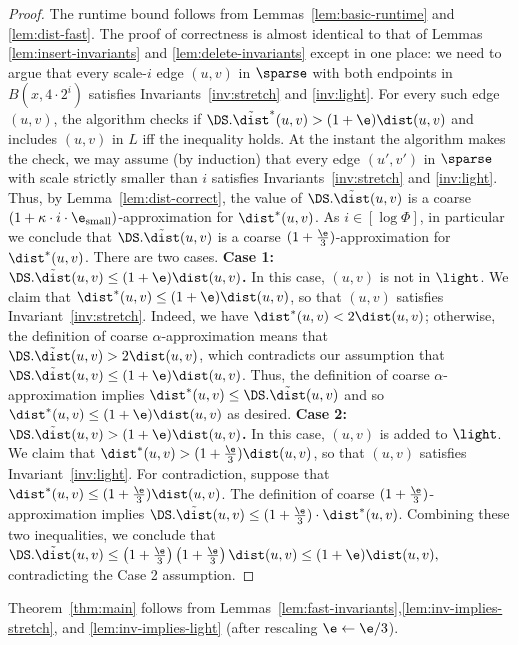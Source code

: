 \begin{proof}
    The runtime bound follows from Lemmas~\ref{lem:basic-runtime} and \ref{lem:dist-fast}. The proof of correctness is almost identical to that of Lemmas \ref{lem:insert-invariants} and \ref{lem:delete-invariants}
    except in one place: we need to argue that every scale-$i$ edge $(u,v)$ in $\sparse$ with both endpoints in $B(x, 4 \cdot 2^i)$ satisfies Invariants~\ref{inv:stretch} and \ref{inv:light}. 
%
    For every such edge $(u,v)$, the algorithm checks if $\DS.\tilde \dist^*(u,v) > (1+\e) \dist(u,v)$ and includes $(u,v)$ in $L$ iff the inequality holds. At the instant the algorithm makes the check, we may assume (by induction) that every edge $(u',v')$ in $\sparse$ with scale strictly smaller than $i$ satisfies Invariants~\ref{inv:stretch} and \ref{inv:light}. Thus, by Lemma~\ref{lem:dist-correct}, the value of $\DS.\tilde \dist(u,v)$ is a coarse $(1 + \kappa \cdot i \cdot \e_{\rm small})$-approximation for $\dist^*(u,v)$. As $i \in [\log \Phi]$, in particular we conclude that $\DS.\tilde \dist(u,v)$  is a coarse $(1+\frac \e 3)$-approximation for $\dist^*(u,v)$.
    There are two cases.
%
%
    \medskip \noindent \textbf{\boldmath Case 1: $\DS.\tilde \dist (u,v) \le (1+\e) \dist(u,v)$.} In this case, $(u,v)$ is not in $\light$. We claim that $\dist^*(u,v) \le (1+\e) \dist(u,v)$, so that $(u,v)$ satisfies Invariant~\ref{inv:stretch}. Indeed, we have $\dist^*(u,v) < 2 \dist(u,v)$; otherwise, the definition of coarse $\alpha$-approximation means that $\DS.\tilde \dist(u,v) > 2\dist(u,v)$, which contradicts our assumption that $\DS.\tilde \dist(u,v) \le (1+\e) \dist(u,v)$. Thus, the definition of coarse $\alpha$-approximation implies $\dist^*(u,v) \le \DS.\tilde \dist(u,v)$ and so $\dist^*(u,v) \le (1+\e) \dist(u,v)$ as desired.
%
%
    \medskip \noindent \textbf{\boldmath Case 2: $\DS.\tilde \dist (u,v) > (1+\e) \dist(u,v)$.} In this case, $(u,v)$ is added to $\light$. We claim that $\dist^*(u,v) > (1+\frac{\e}{3}) \dist(u,v)$, so that $(u,v)$ satisfies Invariant~\ref{inv:light}. For contradiction, suppose that $\dist^*(u,v) \le (1+\frac{\e}{3}) \dist(u,v)$. The definition of coarse $(1+\frac \e 3)$-approximation implies $\DS.\tilde \dist(u,v) \le (1+ \frac \e 3) \cdot \dist^*(u,v)$. Combining these two inequalities, we conclude that
    \(\DS.\tilde \dist(u,v) \le \left(1+\frac \e 3 \right) \left(1+\frac \e 3\right) \dist(u,v) \le (1+\e) \dist(u,v),\)
    contradicting the Case 2 assumption.
\end{proof}
Theorem~\ref{thm:main} follows from Lemmas~\ref{lem:fast-invariants},\ref{lem:inv-implies-stretch}, and \ref{lem:inv-implies-light} (after rescaling $\e \gets \e / 3$).
%
